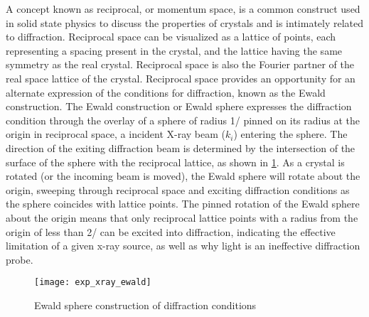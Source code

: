 A concept known as reciprocal, or momentum space, is a common construct used in solid state physics to discuss the properties of crystals and is intimately related to diffraction. Reciprocal space can be visualized as a lattice of points, each representing a spacing present in the crystal, and the lattice having the same symmetry as the real crystal. Reciprocal space is also the Fourier partner of the real space lattice of the crystal. Reciprocal space provides an opportunity for an alternate expression of the conditions for diffraction, known as the Ewald construction. The Ewald construction or Ewald sphere expresses the diffraction condition through the overlay of a sphere of radius 1/\textlambda{} pinned on its radius at the origin in reciprocal space, a incident X-ray beam ($k_i$) entering the sphere. The direction of the exiting diffraction beam is determined by the intersection of the surface of the sphere with the reciprocal lattice, as shown in \cref{fig:exp_xray_ewald}. As a crystal is rotated (or the incoming beam is moved), the Ewald sphere will rotate about the origin, sweeping through reciprocal space and exciting diffraction conditions as the sphere coincides with lattice points. The pinned rotation of the Ewald sphere about the origin means that only reciprocal lattice points with a radius from the origin of less than 2/\textlambda{} can be excited into diffraction, indicating the effective limitation of a given x-ray source, as well as why light is an ineffective diffraction probe.
\begin{figure}
\centering
\texttt{[image: exp\_xray\_ewald]}
\caption{\label{fig:exp_xray_ewald}Ewald sphere construction of diffraction conditions\cite{bobhe}}
\end{figure}

